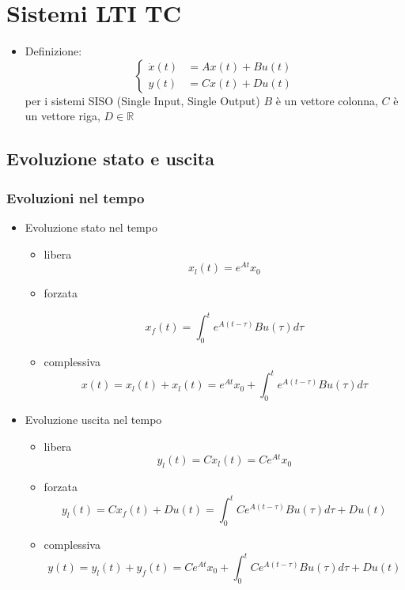 \documentclass[11pt]{article}
\begin{document}
\section{Sistemi LTI TC}
\label{sec:org4e59118}
\begin{itemize}
\item Definizione:
\[\begin{cases}
	  \dot{x}(t) &= Ax(t) + Bu(t) \\
	  y(t) &= Cx(t) + Du(t)
	  \end{cases} \]
per i sistemi SISO (Single Input, Single Output) \(B\) è un vettore colonna,
\(C\) è un vettore riga, \(D \in \mathbb{R}\)
\end{itemize}

\subsection{Evoluzione stato e uscita}
\label{sec:orgba817b5}
\subsubsection{Evoluzioni nel tempo}
\label{sec:org46addc2}
\begin{itemize}
\item Evoluzione stato nel tempo
\begin{itemize}
\item libera
\[x_l (t) = e^{At} x_0\]
\item forzata

  \[x_f (t) = \int_{0}^{t} e^{A(t-\tau)} Bu(\tau) d \tau\]
\item complessiva
\[ x(t) = x_l (t) + x_l (t) =
	    e^{At} x_0 + \int_{0}^{t} e^{A(t-\tau)} Bu(\tau) d \tau \]
\end{itemize}

\item Evoluzione uscita nel tempo
\begin{itemize}
\item libera
\[y_l (t) = C x_l (t) = Ce^{At} x_0\]
\item forzata
\[y_l (t) = C x_f (t) + D u(t) =
	    \int_{0}^{t} C e^{A(t-\tau)} Bu(\tau) d \tau + D u(t) \]
\item complessiva
\[y(t) = y_l (t) + y_f (t) = C e^{At} x_0 +
	    \int_{0}^{t} C e^{A(t-\tau)} Bu(\tau) d \tau + D u(t) \]
\end{itemize}
\end{itemize}
\end{document}
